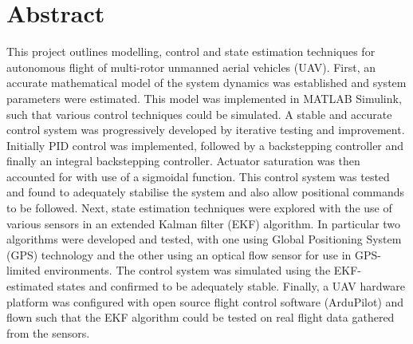 
\chapter*{Abstract}\label{Abstract}
This project outlines modelling, control and state estimation techniques for autonomous flight of multi-rotor unmanned aerial vehicles (UAV). First, an accurate mathematical model of the system dynamics was established and system parameters were estimated. This model was implemented in MATLAB Simulink, such that various control techniques could be simulated. A stable and accurate control system was progressively developed by iterative testing and improvement. Initially PID control was implemented, followed by a backstepping controller and finally an integral backstepping controller. Actuator saturation was then accounted for with use of a sigmoidal function. This control system was tested and found to adequately stabilise the system and also allow positional commands to be followed. Next, state estimation techniques were explored with the use of various sensors in an extended Kalman filter (EKF) algorithm. In particular two algorithms were developed and tested, with one using Global Positioning System (GPS) technology and the other using an optical flow sensor for use in GPS-limited environments. The control system was simulated using the EKF-estimated states and confirmed to be adequately stable. Finally, a UAV hardware platform was configured with open source flight control software (ArduPilot) and flown such that the EKF algorithm could be tested on real flight data gathered from the sensors.
\clearpage



